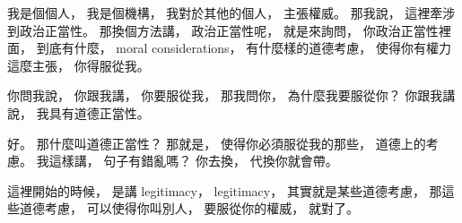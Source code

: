 \hypertarget{w02:cue:980}{}我是個個人，
\hypertarget{w02:cue:981}{}我是個機構，
\hypertarget{w02:cue:982}{}我對於其他的個人，
\hypertarget{w02:cue:983}{}主張權威。
\hypertarget{w02:cue:984}{}那我說，
\hypertarget{w02:cue:985}{}這裡牽涉到政治正當性。
\hypertarget{w02:cue:986}{}那換個方法講，
\hypertarget{w02:cue:987}{}政治正當性呢，
\hypertarget{w02:cue:988}{}就是來詢問，
\hypertarget{w02:cue:989}{}你政治正當性裡面，
\hypertarget{w02:cue:990}{}到底有什麼，
\hypertarget{w02:cue:991}{}moral considerations，
\hypertarget{w02:cue:992}{}有什麼樣的道德考慮，
\hypertarget{w02:cue:993}{}使得你有權力這麼主張，
\hypertarget{w02:cue:994}{}你得服從我。

\hypertarget{w02:cue:995}{}你問我說，
\hypertarget{w02:cue:996}{}你跟我講，
\hypertarget{w02:cue:997}{}你要服從我，
\hypertarget{w02:cue:998}{}那我問你，
\hypertarget{w02:cue:999}{}為什麼我要服從你？
\hypertarget{w02:cue:1000}{}你跟我講說，
\hypertarget{w02:cue:1001}{}我具有道德正當性。

\hypertarget{w02:cue:1002}{}好。
\hypertarget{w02:cue:1003}{}那什麼叫道德正當性？
\hypertarget{w02:cue:1004}{}那就是，
\hypertarget{w02:cue:1005}{}使得你必須服從我的那些，
\hypertarget{w02:cue:1006}{}道德上的考慮。
\hypertarget{w02:cue:1007}{}我這樣講，
\hypertarget{w02:cue:1008}{}句子有錯亂嗎？
\hypertarget{w02:cue:1009}{}你去換，
\hypertarget{w02:cue:1010}{}代換你就會帶。

\hypertarget{w02:cue:1011}{}這裡開始的時候，
\hypertarget{w02:cue:1012}{}是講 legitimacy，
\hypertarget{w02:cue:1013}{}legitimacy，
\hypertarget{w02:cue:1014}{}其實就是某些道德考慮，
\hypertarget{w02:cue:1015}{}那這些道德考慮，
\hypertarget{w02:cue:1016}{}可以使得你叫別人，
\hypertarget{w02:cue:1017}{}要服從你的權威，
\hypertarget{w02:cue:1018}{}就對了。

